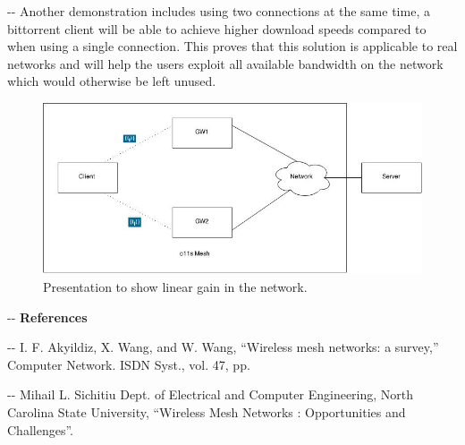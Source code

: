 \documentclass[12pt]{article}
\makeatletter
\newenvironment{indentation}[3]%
	{\par\setlength{\parindent}{#3}
	\setlength{\leftmargin}{#1}       \setlength{\rightmargin}{#1}%
	\advance\linewidth -\leftmargin       \advance\linewidth -\rightmargin%
	\advance\@totalleftmargin\leftmargin  \@setpar{{\@@par}}%
	\parshape 1\@totalleftmargin \linewidth\ignorespaces}{\par}%
\makeatother
\begin{document}
\begin{indentation}{0pt}{0pt}{0pt}
{\normalsize \hspace{1cm} Another demonstration includes using two connections at the same time, a bittorrent client will be able to achieve higher download speeds compared to when using a single connection. This proves that this solution is applicable to real networks and will help the users exploit all available bandwidth on the network which would otherwise be left unused.}
\end{indentation}

\vspace{1cm}

\begin{figure}[h]
  \centering
    \includegraphics[scale=0.50]{ExperimentLayout}
    \caption{Presentation to show linear gain in the network.}
    \label{Diagram: Presentation layout}
\end{figure}

\pagebreak

\begin{indentation}{0pt}{0pt}{0pt}
\textbf{{{\Large References}}}
\end{indentation}

\vspace{1.5cm}

\begin{indentation}{0pt}{0pt}{0pt}
[1] I. F. Akyildiz, X. Wang, and W. Wang, “Wireless mesh networks: a survey,” Computer Network. ISDN Syst., vol. 47, pp.
\end{indentation}

\vspace{1cm}

\begin{indentation}{0pt}{0pt}{0pt}
[2] Mihail L. Sichitiu Dept. of  Electrical and Computer Engineering, North Carolina State 
University, “Wireless Mesh Networks : Opportunities and Challenges”.
\end{indentation}
\end{document}
